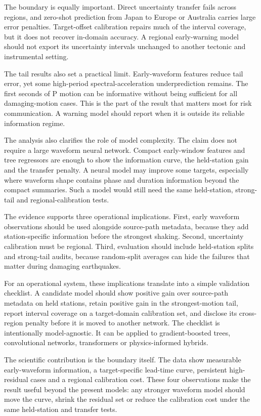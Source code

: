 \documentclass[
  10pt,
]{article}
\begin{document}
The boundary is equally important. Direct uncertainty transfer fails
across regions, and zero-shot prediction from Japan to Europe or
Australia carries large error penalties. Target-offset calibration
repairs much of the interval coverage, but it does not recover in-domain
accuracy. A regional early-warning model should not export its
uncertainty intervals unchanged to another tectonic and instrumental
setting.

The tail results also set a practical limit. Early-waveform features
reduce tail error, yet some high-period spectral-acceleration
underprediction remains. The first seconds of P motion can be
informative without being sufficient for all damaging-motion cases. This
is the part of the result that matters most for risk communication. A
warning model should report when it is outside its reliable information
regime.

The analysis also clarifies the role of model complexity. The claim does
not require a large waveform neural network. Compact early-window
features and tree regressors are enough to show the information curve,
the held-station gain and the transfer penalty. A neural model may
improve some targets, especially where waveform shape contains phase and
duration information beyond the compact summaries. Such a model would
still need the same held-station, strong-tail and regional-calibration
tests.

The evidence supports three operational implications. First, early
waveform observations should be used alongside source-path metadata,
because they add station-specific information before the strongest
shaking. Second, uncertainty calibration must be regional. Third,
evaluation should include held-station splits and strong-tail audits,
because random-split averages can hide the failures that matter during
damaging earthquakes.

For an operational system, these implications translate into a simple
validation checklist. A candidate model should show positive gain over
source-path metadata on held stations, retain positive gain in the
strongest-motion tail, report interval coverage on a target-domain
calibration set, and disclose its cross-region penalty before it is
moved to another network. The checklist is intentionally model-agnostic.
It can be applied to gradient-boosted trees, convolutional networks,
transformers or physics-informed hybrids.

The scientific contribution is the boundary itself. The data show
measurable early-waveform information, a target-specific lead-time
curve, persistent high-residual cases and a regional calibration cost.
These four observations make the result useful beyond the present
models: any stronger waveform model should move the curve, shrink the
residual set or reduce the calibration cost under the same held-station
and transfer tests.
\end{document}
